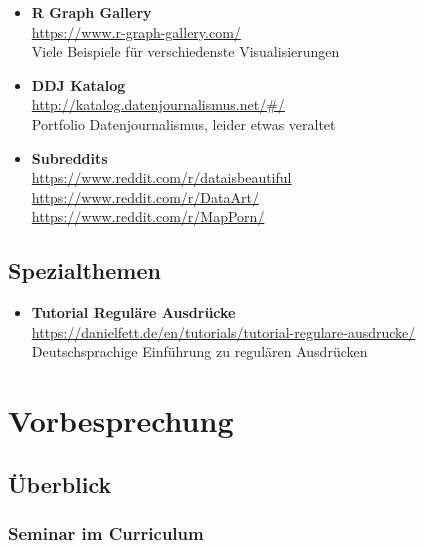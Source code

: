 \documentclass[11pt,german,a4paper]{article}
\providecommand{\tightlist}{%
  \setlength{\itemsep}{0pt}\setlength{\parskip}{0pt}}
\begin{document}
\begin{itemize}
\item
  \textbf{R Graph Gallery}\\
  \url{https://www.r-graph-gallery.com/}~\\
  Viele Beispiele für verschiedenste Visualisierungen
\item
  \textbf{DDJ Katalog}\\
  \url{http://katalog.datenjournalismus.net/\#/}~\\
  Portfolio Datenjournalismus, leider etwas veraltet
\item
  \textbf{Subreddits}\\
  \url{https://www.reddit.com/r/dataisbeautiful}~\\
  \url{https://www.reddit.com/r/DataArt/}~\\
  \url{https://www.reddit.com/r/MapPorn/}
\end{itemize}

\hypertarget{spezialthemen}{%
\subsection*{Spezialthemen}\label{spezialthemen}}

\begin{itemize}
\tightlist
\item
  \textbf{Tutorial Reguläre Ausdrücke}\\
  \url{https://danielfett.de/en/tutorials/tutorial-regulare-ausdrucke/}~\\
  Deutschsprachige Einführung zu regulären Ausdrücken
\end{itemize}

\hypertarget{vorbesprechung}{%
\section{Vorbesprechung}\label{vorbesprechung}}

\hypertarget{uxfcberblick}{%
\subsection{Überblick}\label{uxfcberblick}}

\hypertarget{seminar-im-curriculum}{%
\subsubsection{Seminar im Curriculum}\label{seminar-im-curriculum}}
\end{document}
